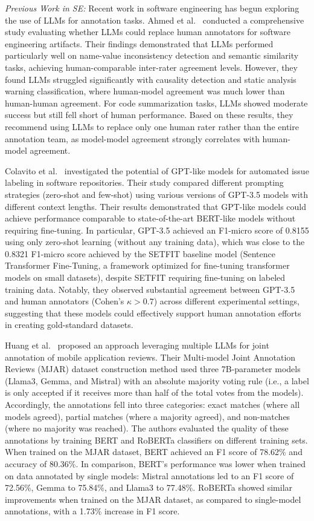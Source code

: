 \documentclass[11pt]{article}
\begin{document}
\emph{Previous Work in SE:} Recent work in software engineering has begun exploring the use of LLMs for annotation tasks. 
Ahmed et al.~\cite{DBLP:journals/corr/abs-2408-05534} conducted a comprehensive study evaluating whether LLMs could replace human annotators for software engineering artifacts.
Their findings demonstrated that LLMs performed particularly well on name-value inconsistency detection and semantic similarity tasks, achieving human-comparable inter-rater agreement levels. 
However, they found LLMs struggled significantly with causality detection and static analysis warning classification, where human-model agreement was much lower than human-human agreement. 
For code summarization tasks, LLMs showed moderate success but still fell short of human performance. 
Based on these results, they recommend using LLMs to replace only one human rater rather than the entire annotation team, as model-model agreement strongly correlates with human-model agreement.

Colavito et al.~\cite{DBLP:conf/msr/ColavitoLNQ24} investigated the potential of GPT-like models for automated issue labeling in software repositories. 
Their study compared different prompting strategies (zero-shot and few-shot) using various versions of GPT-3.5 models with different context lengths. 
Their results demonstrated that GPT-like models could achieve performance comparable to state-of-the-art BERT-like models without requiring fine-tuning. 
In particular, GPT-3.5 achieved an F1-micro score of 0.8155 using only zero-shot learning (without any training data), which was close to the 0.8321 F1-micro score achieved by the SETFIT baseline model (Sentence Transformer Fine-Tuning, a framework optimized for fine-tuning transformer models on small datasets), despite SETFIT requiring fine-tuning on labeled training data.
Notably, they observed substantial agreement between GPT-3.5 and human annotators (Cohen's $\kappa > 0.7$) across different experimental settings, suggesting that these models could effectively support human annotation efforts in creating gold-standard datasets.

Huang et al.~\cite{Huang2023Enhancing} proposed an approach leveraging multiple LLMs for joint annotation of mobile application reviews. 
Their Multi-model Joint Annotation Reviews (MJAR) dataset construction method used three 7B-parameter models (Llama3, Gemma, and Mistral) with an absolute majority voting rule (i.e., a label is only accepted if it receives more than half of the total votes from the models). 
Accordingly, the annotations fell into three categories: exact matches (where all models agreed), partial matches (where a majority agreed), and non-matches (where no majority was reached). 
The authors evaluated the quality of these annotations by training BERT and RoBERTa classifiers on different training sets. 
When trained on the MJAR dataset, BERT achieved an F1 score of 78.62\% and accuracy of 80.36\%. 
In comparison, BERT's performance was lower when trained on data annotated by single models: Mistral annotations led to an F1 score of 72.56\%, Gemma to 75.84\%, and Llama3 to 77.48\%.
RoBERTa showed similar improvements when trained on the MJAR dataset, as compared to single-model annotations, with a 1.73\% increase in F1 score.
\end{document}
